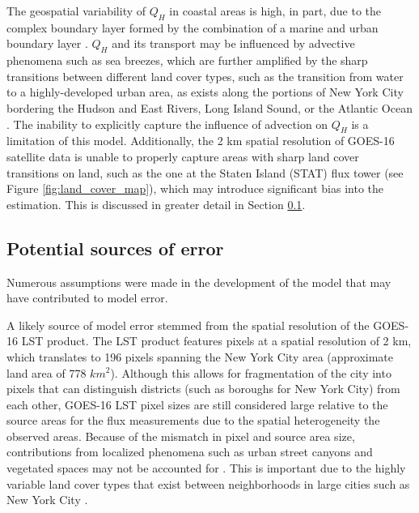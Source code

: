 The geospatial variability of $Q_H$ in coastal areas is high, in part, due to the complex boundary layer formed by the combination of a marine and urban boundary layer \citep{Melecio-Vazquez_2018, Thompson_2007}. $Q_H$ and its transport may be influenced by advective phenomena such as sea breezes, which are further amplified by the sharp transitions between different land cover types, such as the transition from water to a highly-developed urban area, as exists along the portions of New York City bordering the Hudson and East Rivers, Long Island Sound, or the Atlantic Ocean \citep{Bou-Zeid_2020, Lee_2015, Thompson_2007}. The inability to explicitly capture the influence of advection on $Q_H$ is a limitation of this model. Additionally, the 2 km spatial resolution of GOES-16 satellite data is unable to properly capture areas with sharp land cover transitions on land, such as the one at the Staten Island (STAT) flux tower (see Figure \ref{fig:land_cover_map}), which may introduce significant bias into the estimation. This is discussed in greater detail in Section \ref{section:potential-sources-of-error}.

\subsection{Potential sources of error} \label{section:potential-sources-of-error}

Numerous assumptions were made in the development of the model that may have contributed to model error. 

A likely source of model error stemmed from the spatial resolution of the GOES-16 LST product. The LST product features pixels at a spatial resolution of 2 km, which translates to 196 pixels spanning the New York City area (approximate land area of 778 $km^2$). Although this allows for fragmentation of the city into pixels that can distinguish districts (such as boroughs for New York City) from each other, GOES-16 LST pixel sizes are still considered large relative to the source areas for the flux measurements due to the spatial heterogeneity the observed areas. Because of the mismatch in pixel and source area size, contributions from localized phenomena such as urban street canyons and vegetated spaces may not be accounted for \citep{Erell_2006, Xiaomin_2006}. This is important due to the highly variable land cover types that exist between neighborhoods in large cities such as New York City \citep{Hamstead_2015}. 

